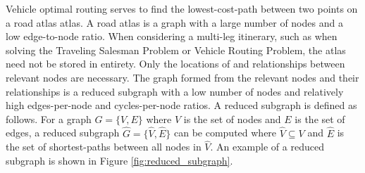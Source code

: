 \documentclass[11pt]{article}
\begin{document}
\begin{multicols}{2}
Vehicle optimal routing serves to find the lowest-cost-path between two points on a road atlas atlas. A road atlas is a graph with a large number of nodes and a low edge-to-node ratio. When considering a multi-leg itinerary, such as when solving the Traveling Salesman Problem or Vehicle Routing Problem, the atlas need not be stored in entirety. Only the locations of and relationships between relevant nodes are necessary. The graph formed from the relevant nodes and their relationships is a reduced subgraph with a low number of nodes and relatively high edges-per-node and cycles-per-node ratios. A reduced subgraph is defined as follows. For a graph $G = \{V, E\}$ where $V$ is the set of nodes and $E$ is the set of edges, a reduced subgraph $\hat{G} = \{\hat{V}, \hat{E}\}$ can be computed where $\hat{V} \subseteq V$ and $\hat{E}$ is the set of shortest-paths between all nodes in $\hat{V}$. An example of a reduced subgraph is shown in Figure \ref{fig:reduced_subgraph}.


\end{multicols}
\end{document}
